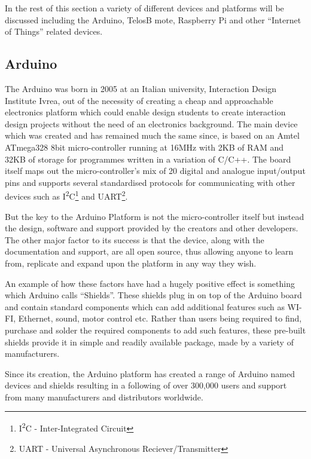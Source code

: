 In the rest of this section a variety of different devices and platforms will be discussed including the Arduino, TelosB mote, Raspberry Pi and other ``Internet of Things'' related devices. 

\subsection{Arduino} %
\label{sub:arduino}

The Arduino was born in 2005 at an Italian university, Interaction Design Institute Ivrea, out of the necessity of creating a cheap and approachable electronics platform which could enable design students to create interaction design projects without the need of an electronics background.
The main device which was created and has remained much the same since, is based on an Amtel ATmega328 8bit micro-controller running at 16MHz with 2KB of RAM and 32KB of storage for programmes written in a variation of C/C++. The board itself maps out the micro-controller's mix of 20 digital and analogue input/output pins and supports several standardised protocols for communicating with other devices such as I\textsuperscript{2}C\footnote{I\textsuperscript{2}C - Inter-Integrated Circuit} and UART\footnote{UART - Universal Asynchronous Reciever/Transmitter}. 

But the key to the Arduino Platform is not the micro-controller itself but instead the design, software and support provided by the creators and other developers. The other major factor to its success is that the device, along with the documentation and support, are all open source, thus allowing anyone to learn from, replicate and expand upon the platform in any way they wish.

An example of how these factors have had a hugely positive effect is something which Arduino calls ``Shields''. These shields plug in on top of the Arduino board and contain standard components which can add additional features such as WI-FI, Ethernet, sound, motor control etc. Rather than users being required to find, purchase and solder the required components to add such features, these pre-built shields provide it in simple and readily available package, made by a variety of manufacturers.

Since its creation, the Arduino platform has created a range of Arduino named devices and shields resulting in a following of over 300,000 users\cite{ArduinoNumbers} and support from many manufacturers and distributors worldwide. 

